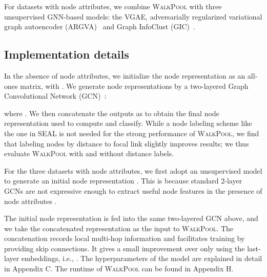 \documentclass[11pt]{article}
\newcommand{\walkpool}{\textsc{WalkPool}\xspace}
\newcommand{\UPDATE}[1]{\textcolor{WowColor}{{#1}}}
\renewcommand{\UPDATE}[1]{#1}
\begin{document}
For datasets with node attributes, we combine \walkpool with three unsupervised GNN-based models: the VGAE, adversarially regularized variational graph autoencoder (ARGVA)~\citep{pan2018adversarially} and Graph InfoClust (GIC)~\citep{mavromatis2020graph}.  
\subsection{Implementation details}
\vspace{-1mm}
In the absence of node attributes, we initialize the node representation  as an  all-ones matrix, with . We generate node representations by a two-layered Graph Convolutional Network (GCN)~\citep{kipf2016semi}:

where . We then concatenate the outputs as  to obtain the final node representation used to compute  and classify. While a node labeling scheme like the one in SEAL is not needed for the strong performance of \walkpool, we find that labeling nodes by distance to focal link slightly improves results; we thus evaluate \walkpool with and without distance labels.

For the three datasets with node attributes, we first adopt an unsupervised model to generate an initial node representation . This is because standard 2-layer GCNs are not expressive enough to extract useful node features in the presence of node attributes \citet{zhang2019graph}.



The initial node representation is fed into the same two-layered GCN above, and we take the concatenated representation  as the input to \walkpool. \UPDATE{The concatenation records local multi-hop information and facilitates training by providing skip connections. It gives a small improvement over only using the last-layer embeddings, i.e., .} The hyperparameters of the model are explained in detail in Appendix C. \UPDATE{The runtime of \walkpool can be found in Appendix H.}
\vspace{-1mm}
\end{document}
